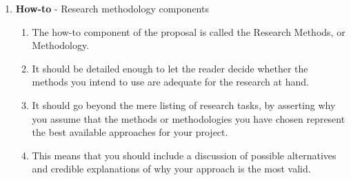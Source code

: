 \begin{tcolorbox}
\begin{enumerate}
		\item \textbf{How-to} - Research methodology components 
		
		\begin{enumerate}
			\item The how-to component of the proposal is called the Research Methods, or Methodology. 
			
			\item It should be detailed enough to let the reader decide whether the methods you intend to use are adequate for the research at hand. 
			
			\item It should go beyond the mere listing of research tasks, by asserting why you assume that the methods or methodologies you have chosen represent the best available approaches for your project.
			
			\item This means that you should include a discussion of possible alternatives and credible explanations of why your approach is the most valid.
			
		\end{enumerate}
		
		
	\end{enumerate}
	
\end{tcolorbox}
